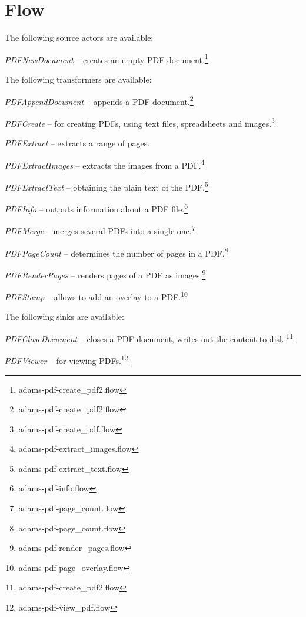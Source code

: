 \documentclass[a4paper]{book}
\begin{document}
\chapter{Flow}
The following source actors are available:
\begin{tight_itemize}
	\item \textit{PDFNewDocument} -- creates an empty PDF document.\footnote{adams-pdf-create\_pdf2.flow}
\end{tight_itemize}
The following transformers are available:
\begin{tight_itemize}
	\item \textit{PDFAppendDocument} -- appends a PDF document.\footnote{adams-pdf-create\_pdf2.flow}
	\item \textit{PDFCreate} -- for creating PDFs, using text files,
	spreadsheets and images.\footnote{adams-pdf-create\_pdf.flow}
	\item \textit{PDFExtract} -- extracts a range of pages.
	\item \textit{PDFExtractImages} -- extracts the images from a PDF.\footnote{adams-pdf-extract\_images.flow}
	\item \textit{PDFExtractText} -- obtaining the plain text of the PDF.\footnote{adams-pdf-extract\_text.flow}
	\item \textit{PDFInfo} -- outputs information about a PDF file.\footnote{adams-pdf-info.flow}
	\item \textit{PDFMerge} -- merges several PDFs into a single one.\footnote{adams-pdf-page\_count.flow}
	\item \textit{PDFPageCount} -- determines the number of pages in a
	PDF.\footnote{adams-pdf-page\_count.flow}
	\item \textit{PDFRenderPages} -- renders pages of a PDF as images.\footnote{adams-pdf-render\_pages.flow}
	\item \textit{PDFStamp} -- allows to add an overlay to a PDF.\footnote{adams-pdf-page\_overlay.flow}
\end{tight_itemize}
The following sinks are available:
\begin{tight_itemize}
	\item \textit{PDFCloseDocument} -- closes a PDF document, writes out the content
	to disk.\footnote{adams-pdf-create\_pdf2.flow}
	\item \textit{PDFViewer} -- for viewing PDFs.\footnote{adams-pdf-view\_pdf.flow}
\end{tight_itemize}
\end{document}
